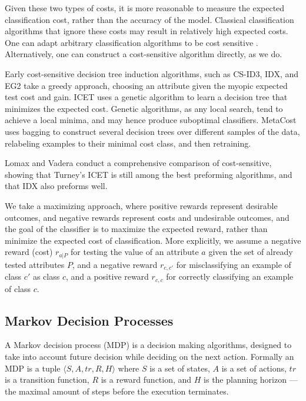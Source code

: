 \documentclass[letterpaper]{article}
\theoremstyle{definition}
\begin{document}
Given these two types of costs, it is more reasonable to measure the expected classification cost, rather than the accuracy of the model. Classical classification algorithms that ignore these costs may result in relatively high expected costs. One can adapt arbitrary classification algorithms to be cost sensitive \cite{zadrozny2003cost,domingos1999metacost}. Alternatively, one can construct a cost-sensitive algorithm directly, as we do.


Early cost-sensitive decision tree induction algorithms, such as CS-ID3, IDX, and EG2 take a greedy approach, choosing an attribute given the myopic expected test cost and gain. ICET \cite{turney1995cost} uses a genetic algorithm to learn a decision tree that minimizes the expected cost. Genetic algorithms, as any local search, tend to achieve a local minima, and may hence produce suboptimal classifiers. MetaCost \cite{domingos1999metacost} uses bagging to construct several decision trees over different samples of the data, relabeling examples to their minimal cost class, and then retraining.

Lomax and Vadera \cite{LomaxV11} conduct a comprehensive comparison of cost-sensitive, showing that Turney's ICET is still among the best preforming algorithms, and that IDX \cite{IDX} also preforms well.

We take a maximizing approach, where positive rewards represent desirable outcomes, and negative rewards represent costs and undesirable outcomes, and the goal of the classifier is to maximize the expected reward, rather than minimize the expected cost of classification.
More explicitly, we assume a negative reward (cost) $r_{a|P}$ for testing the value of an attribute $a$ given the set of already tested attributes $P$, and a negative reward $r_{c,c'}$ for misclassifying an example of class $c'$ as class $c$, and a positive reward $r_{c,c}$ for correctly classifying an example of class $c$.


\subsection{Markov Decision Processes}

A Markov decision process (MDP) \cite{Bellman,Puterman} is a decision making algorithms, designed to take into account future decision while deciding on the next action. Formally an MDP is a tuple $\langle S,A,tr,R,H \rangle$ where $S$ is a set of states, $A$ is a set of actions, $tr$ is a transition function, $R$ is a reward function, and $H$ is the planning horizon --- the maximal amount of steps before the execution terminates.
\end{document}
